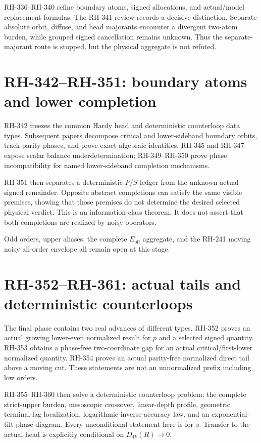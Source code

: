 \documentclass[11pt]{article}
\theoremstyle{definition}
\theoremstyle{remark}
\newcommand{\Eoff}{E_{\mathrm{off}}}
\begin{document}
RH-336--RH-340 refine boundary atoms, signed allocations, and actual/model
replacement formulas.  The RH-341 review records a decisive distinction.
Separate absolute orbit, diffuse, and head majorants encounter a divergent
two-atom burden, while grouped signed cancellation remains unknown.  Thus the
separate-majorant route is stopped, but the physical aggregate is not
refuted.

\section{RH-342--RH-351: boundary atoms and lower completion}

RH-342 freezes the common Hardy head and deterministic counterloop data
types.  Subsequent papers decompose critical and lower-sideband boundary
orbits, track parity phases, and prove exact algebraic identities.  RH-345
and RH-347 expose scalar balance underdetermination; RH-349--RH-350 prove
phase incompatibility for named lower-sideband completion mechanisms.

RH-351 then separates a deterministic $P/S$ ledger from the unknown actual
signed remainder.  Opposite abstract completions can satisfy the same visible
premises, showing that those premises do not determine the desired selected
physical verdict.  This is an information-class theorem.  It does not assert
that both completions are realized by noisy operators.

Odd orders, upper aliases, the complete $\Eoff$ aggregate, and the RH-241
moving noisy all-order envelope all remain open at this stage.

\section{RH-352--RH-361: actual tails and deterministic counterloops}

The final phase contains two real advances of different types.  RH-352 proves
an actual growing lower-even normalized result for $p$ and a selected signed
quantity.  RH-353 obtains a phase-free two-coordinate gap for an actual
critical/first-lower normalized quantity.  RH-354 proves an actual
parity-free normalized direct tail above a moving cut.  These statements are
not an unnormalized prefix including low orders.

RH-355--RH-360 then solve a deterministic counterloop problem: the complete
strict-upper burden, mesoscopic crossover, linear-depth profile, geometric
terminal-lag localization, logarithmic inverse-accuracy law, and an
exponential-tilt phase diagram.  Every unconditional statement here is for
$s$.  Transfer to the actual head is explicitly conditional on
$D_{4k}(R)\to0$.
\end{document}
